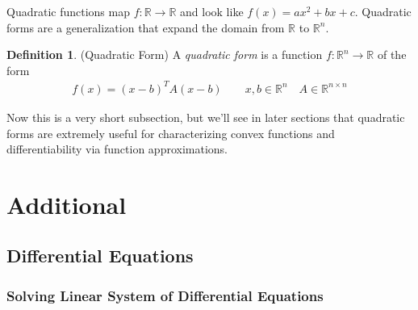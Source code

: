 \documentclass[12pt]{book}
\numberwithin{equation}{section} %
\theoremstyle{plain}
\theoremstyle{definition}
\newtheorem{defn}[thm]{Definition}
\theoremstyle{remark}
\newcommand{\R}{\mathbb{R}}
\newcommand{\Rn}{\mathbb{R}^n}
\newcommand{\Rnn}{\mathbb{R}^{n\times n}}
\begin{document}
Quadratic functions map $f:\R\rightarrow\R$ and look like $f(x)=ax^2 +
bx+c$. Quadratic forms are a generalization that expand the domain from
$\R$ to $\Rn$.

\begin{defn}{(Quadratic Form)}
A \emph{quadratic form} is a function $f:\Rn\rightarrow\R$ of the form
\begin{align*}
  f(x) = (x-b)^TA(x-b)
  \qquad x,b\in\Rn \quad A\in\Rnn
\end{align*}
\end{defn}

Now this is a very short subsection, but we'll see in later sections
that quadratic forms are extremely useful for characterizing convex
functions and differentiability via function approximations.





\clearpage
\chapter{Additional}

\clearpage
\section{Differential Equations}

\subsection{Solving Linear System of Differential Equations}
\end{document}
